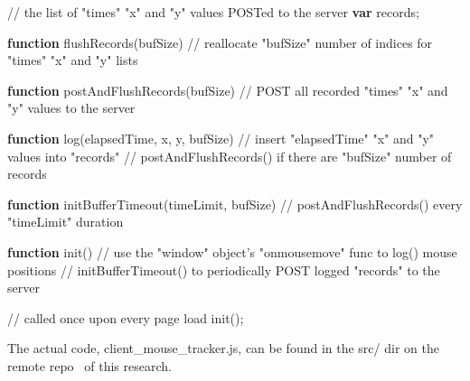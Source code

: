 {\color{darkgray} // the list of "times" "x" and "y" values POSTed to the server}
\newline
{\color{blue} \textbf{var}} records;

{\color{blue} \textbf{function}} flushRecords(bufSize)
\newline
\hspace*{25pt} {\color{darkgray} // reallocate "bufSize" number of indices for "times" "x" and "y" lists}

{\color{blue} \textbf{function}} postAndFlushRecords(bufSize)
\newline
\hspace*{25pt} {\color{darkgray} // POST all recorded "times" "x" and "y" values to the server}

{\color{blue} \textbf{function}} log(elapsedTime, x, y, bufSize)
\newline
\hspace*{25pt} {\color{darkgray} // insert "elapsedTime" "x" and "y" values into "records"}
\newline
\hspace*{25pt} {\color{darkgray} // postAndFlushRecords() if there are "bufSize" number of records}

{\color{blue} \textbf{function}} initBufferTimeout(timeLimit, bufSize)
\newline
\hspace*{25pt} {\color{darkgray} // postAndFlushRecords() every "timeLimit" duration}

{\color{blue} \textbf{function}} init()
\newline
\hspace*{25pt} {\color{darkgray} // use the "window" object's "onmousemove" func to log() mouse positions}
\newline
\hspace*{25pt} {\color{darkgray} // initBufferTimeout() to periodically POST logged "records" to the server}

{\color{darkgray} // called once upon every page load}
\newline
init();

The actual code, client{\_}mouse{\_}tracker.js, can be found in the src/ dir on the remote repo~\cite{thesis_github_repo} of this research.

